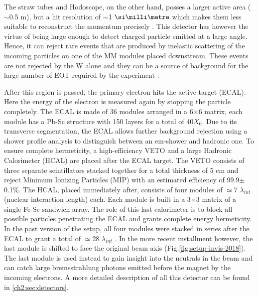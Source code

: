 The straw tubes and Hodoscope, on the other hand, posses a larger active area ($\sim$0.5 m), but a hit resolution of $\sim$1 $\mmi$ which makes them less suitable to reconstruct the momentum precisely \cite{Volkov:2019qhb}. This detector has however the virtue of being large enough to detect charged particle emitted at a large angle. Hence, it can reject rare events that are produced by inelastic scattering of the incoming particles on one of the MM modules placed downstream. These events are not rejected by the W alone and they can be a source of background for the large number of EOT required by the experiment \cite{na64-prd}. 

After this region is passed, the primary electron hits the active target (ECAL). Here the energy of the electron is measured again by stopping the particle completely. The ECAL is made of 36 modules arranged in a 6$\times$6 matrix, each module has a Pb-Sc structure with 150 layers for a total of 40$X_0$. Due to its transverse segmentation, the ECAL allows further background rejection using a shower profile analysis to distinguish between an em-shower and hadronic one. To ensure complete hermeticity, a high-efficiency VETO and a large Hadronic Calorimeter (HCAL) are placed after the ECAL target. The VETO consists of three separate scintillators stacked together for a total thickness of 5 \si{\centi\meter} and reject Minimum Ionizing Particles (MIP) with an estimated efficiency of 99.9$\pm$0.1\%. The HCAL, placed immediately after, consists of four modules of $\simeq$7 $\lambda_{int}$ (nuclear interaction length) each. Each module is built in a 3$\times$3 matrix of a single Fe-Sc sandwich array. The role of this last calorimeter is to block all possible particles penetrating the ECAL and grants complete energy hermeticity. In the past version of the setup, all four modules were stacked in series after the ECAL to grant a total of $\simeq$28 $\lambda_{int}$ \cite{Banerjee:2016tad}. In the more recent installment however, the last module is shifted to face the original beam axis (Fig.\ref{fig:setup-invis-2018}). The last module is used instead to gain insight into the neutrals in the beam and can catch large bremsstrahlung photons emitted before the magnet by the incoming electrons. A more detailed description of all this detector can be found in \ref{ch2:sec:detectors}.

